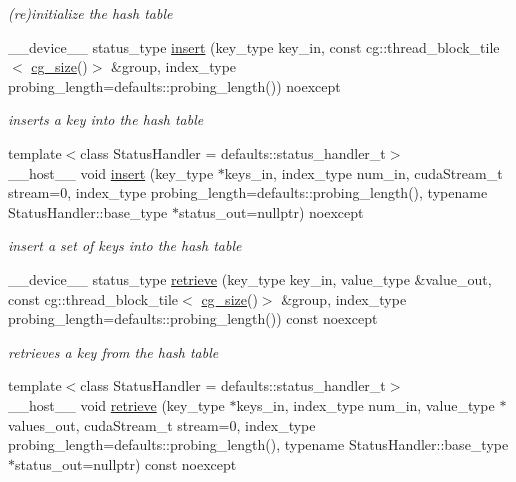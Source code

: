 \begin{DoxyCompactItemize}
\begin{DoxyCompactList}\small\item\em (re)initialize the hash table \end{DoxyCompactList}\item 
\+\_\+\+\_\+device\+\_\+\+\_\+ status\+\_\+type \hyperlink{classwarpcore_1_1CountingHashTable_a2cad25fea134d836cf1b75f67d6b38ac}{insert} (key\+\_\+type key\+\_\+in, const cg\+::thread\+\_\+block\+\_\+tile$<$ \hyperlink{classwarpcore_1_1CountingHashTable_aeaf1b333eb176da987dee4d003e5dddc}{cg\+\_\+size}()$>$ \&group, index\+\_\+type probing\+\_\+length=defaults\+::probing\+\_\+length()) noexcept
\begin{DoxyCompactList}\small\item\em inserts a key into the hash table \end{DoxyCompactList}\item 
{\footnotesize template$<$class Status\+Handler  = defaults\+::status\+\_\+handler\+\_\+t$>$ }\\\+\_\+\+\_\+host\+\_\+\+\_\+ void \hyperlink{classwarpcore_1_1CountingHashTable_a36d896f2f66465925ea21a9f01bb12f3}{insert} (key\+\_\+type $\ast$keys\+\_\+in, index\+\_\+type num\+\_\+in, cuda\+Stream\+\_\+t stream=0, index\+\_\+type probing\+\_\+length=defaults\+::probing\+\_\+length(), typename Status\+Handler\+::base\+\_\+type $\ast$status\+\_\+out=nullptr) noexcept
\begin{DoxyCompactList}\small\item\em insert a set of keys into the hash table \end{DoxyCompactList}\item 
\+\_\+\+\_\+device\+\_\+\+\_\+ status\+\_\+type \hyperlink{classwarpcore_1_1CountingHashTable_ab156b6726ca60e401fae990274b40cfc}{retrieve} (key\+\_\+type key\+\_\+in, value\+\_\+type \&value\+\_\+out, const cg\+::thread\+\_\+block\+\_\+tile$<$ \hyperlink{classwarpcore_1_1CountingHashTable_aeaf1b333eb176da987dee4d003e5dddc}{cg\+\_\+size}()$>$ \&group, index\+\_\+type probing\+\_\+length=defaults\+::probing\+\_\+length()) const noexcept
\begin{DoxyCompactList}\small\item\em retrieves a key from the hash table \end{DoxyCompactList}\item 
{\footnotesize template$<$class Status\+Handler  = defaults\+::status\+\_\+handler\+\_\+t$>$ }\\\+\_\+\+\_\+host\+\_\+\+\_\+ void \hyperlink{classwarpcore_1_1CountingHashTable_a9abe12f3b4110a53e0cfc89a480a798f}{retrieve} (key\+\_\+type $\ast$keys\+\_\+in, index\+\_\+type num\+\_\+in, value\+\_\+type $\ast$values\+\_\+out, cuda\+Stream\+\_\+t stream=0, index\+\_\+type probing\+\_\+length=defaults\+::probing\+\_\+length(), typename Status\+Handler\+::base\+\_\+type $\ast$status\+\_\+out=nullptr) const noexcept

\end{DoxyCompactItemize}
